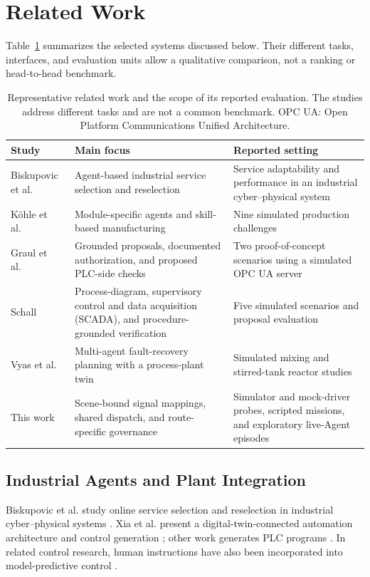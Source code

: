 \section{Related Work}
\label{sec:related}
Table~\ref{tab:related-comparison} summarizes the selected systems discussed below. Their different tasks, interfaces, and evaluation units allow a qualitative comparison, not a ranking or head-to-head benchmark.

\begin{table}[!t]
\centering
\caption{Representative related work and the scope of its reported evaluation. The studies address different tasks and are not a common benchmark. OPC UA: Open Platform Communications Unified Architecture.}
\label{tab:related-comparison}
\footnotesize
\setlength{\tabcolsep}{5pt}
\begin{tabularx}{\textwidth}{@{}>{\raggedright\arraybackslash}p{}>{\raggedright\arraybackslash}p{}X@{}}
\toprule
Study & Main focus & Reported setting \\
\midrule
Biskupovic et al.~\cite{biskupovic2025supervision} & Agent-based industrial service selection and reselection & Service adaptability and performance in an industrial cyber--physical system \\
K\"{o}hle et al.~\cite{koehle2026llmdriven} & Module-specific agents and skill-based manufacturing & Nine simulated production challenges \\
Graul et al.~\cite{graul2026aas} & Grounded proposals, documented authorization, and proposed PLC-side checks & Two proof-of-concept scenarios using a simulated OPC UA server \\
Schall~\cite{schall2026safe} & Process-diagram, supervisory control and data acquisition (SCADA), and procedure-grounded verification & Five simulated scenarios and proposal evaluation \\
Vyas et al.~\cite{vyas2026detection} & Multi-agent fault-recovery planning with a process-plant twin & Simulated mixing and stirred-tank reactor studies \\
This work & Scene-bound signal mappings, shared dispatch, and route-specific governance & Simulator and mock-driver probes, scripted missions, and exploratory live-Agent episodes \\
\bottomrule
\end{tabularx}
\end{table}

\subsection{Industrial Agents and Plant Integration}
Biskupovic et al. study online service selection and reselection in industrial cyber--physical systems \cite{biskupovic2025supervision}. Xia et al. present a digital-twin-connected automation architecture and control generation \cite{xia2025architecture,xia2025control}; other work generates PLC programs \cite{liu2026agents4plc}. In related control research, human instructions have also been incorporated into model-predictive control \cite{wu2025instructmpc}.

